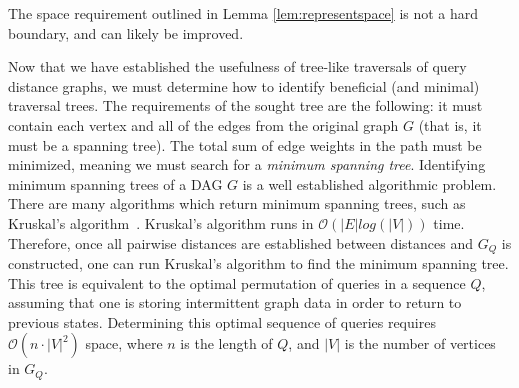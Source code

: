 \begin{remark}
The space requirement outlined in Lemma \ref{lem:representspace} is not a hard boundary, and can likely be improved. 
\end{remark}

\null \quad \quad Now that we have established the usefulness of tree-like traversals of query distance graphs, we must determine how to identify beneficial (and minimal) traversal trees. The requirements of the sought tree are the following: it must contain each vertex and all of the edges from the original graph $G$ (that is, it must be a spanning tree). The total sum of edge weights in the path must be minimized, meaning we must search for a \textit{minimum spanning tree}. \newline
\null \quad \quad Identifying minimum spanning trees of a DAG $G$ is a well established algorithmic problem. There are many algorithms which return minimum spanning trees, such as Kruskal's algorithm~\cite{spanning}. Kruskal's algorithm runs in $\mathcal{O}(|E| log(|V|))$ time. \newline
\null \quad \quad Therefore, once all pairwise distances are established between distances and $G_{Q}$ is constructed, one can run Kruskal's algorithm to find the minimum spanning tree. This tree is equivalent to the optimal permutation of queries in a sequence $Q$, assuming that one is storing intermittent graph data in order to return to previous states. Determining this optimal sequence of queries requires $\mathcal{O}(n \cdot |V|^{2})$ space, where $n$ is the length of $Q$, and $|V|$ is the number of vertices in $G_{Q}$. 


\begin{figure}[h!]
\begin{center}
\end{center}
\caption{}
\label{permutationexample}
\end{figure}

